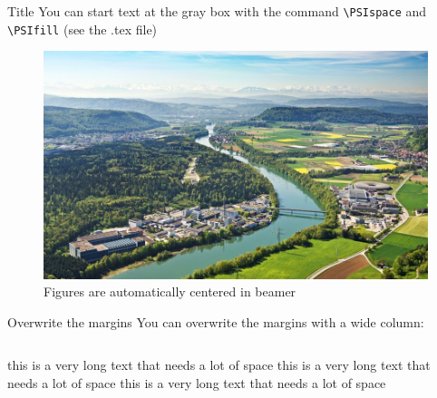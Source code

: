 \documentclass[aspectratio=169]{beamer}
\begin{document}
 \begin{frame}{Title}
   \PSIvspace
  You can start text at the gray box with the command \texttt{\textbackslash PSIspace} and \texttt{\textbackslash PSIfill} (see the .tex file)
  \begin{figure}
    \includegraphics[width=0.3\pagewidth]{PSIlandscape43}
    \caption{Figures are automatically centered in beamer}
    \label{fig:PSI}
  \end{figure}

     \PSIfill
\end{frame}

\begin{frame}{Overwrite the margins}
You can overwrite the margins with a wide column:
  \begin{columns}
  \begin{column}{1.18\linewidth}
    \colorbox{structure!10}{
      \begin{minipage}[t][0.8\textheight][t]{\textwidth}
        this is a very long text that needs a lot of space this is a very long text that needs a lot of space this is a very long text that needs a lot of space 
      \end{minipage}}
  \end{column}
\end{columns}
\end{frame}

  
\end{document}
